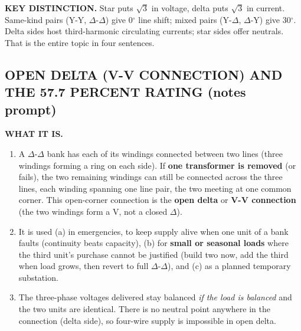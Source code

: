 \documentclass[11pt]{article}
\newcommand{\tagline}[1]{\textbf{\color{copper}#1}}
\newcommand{\keydist}[1]{\vspace{2pt}\textbf{\color{red}KEY DISTINCTION.} #1}
\begin{document}
\keydist{Star puts $\sqrt{3}$ in voltage, delta puts $\sqrt{3}$ in current. Same-kind pairs (Y-Y, $\Delta$-$\Delta$) give 0$^\circ$ line shift; mixed pairs (Y-$\Delta$, $\Delta$-Y) give 30$^\circ$. Delta sides host third-harmonic circulating currents; star sides offer neutrals. That is the entire topic in four sentences.}

\hrulefill
\subsection*{\color{copper}OPEN DELTA (V-V CONNECTION) AND THE 57.7 PERCENT RATING (notes prompt)}

\tagline{WHAT IT IS.}
\begin{enumerate}[label=\arabic*.]
\item A $\Delta$-$\Delta$ bank has each of its windings connected between two lines (three windings forming a ring on each side). If \textbf{one transformer is removed} (or fails), the two remaining windings can still be connected across the three lines, each winding spanning one line pair, the two meeting at one common corner. This open-corner connection is the \textbf{open delta} or \textbf{V-V connection} (the two windings form a V, not a closed $\Delta$).
\item It is used (a) in emergencies, to keep supply alive when one unit of a bank faults (continuity beats capacity), (b) for \textbf{small or seasonal loads} where the third unit's purchase cannot be justified (build two now, add the third when load grows, then revert to full $\Delta$-$\Delta$), and (c) as a planned temporary substation.
\item The three-phase voltages delivered stay balanced \emph{if the load is balanced} and the two units are identical. There is no neutral point anywhere in the connection (delta side), so four-wire supply is impossible in open delta.
\end{enumerate}
\end{document}
